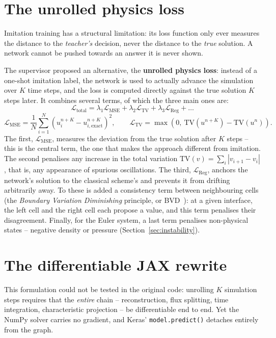 \documentclass[12pt,a4paper,oneside]{report}
\begin{document}
\section{The unrolled physics loss}
\label{sec:loss}

Imitation training has a structural limitation: its loss function only ever
measures the distance to the \emph{teacher's} decision, never the distance to
the \emph{true} solution. A network cannot be pushed towards an answer it is
never shown.

The supervisor proposed an alternative, the \textbf{unrolled physics loss}:
instead of a one-shot imitation label, the network is used to actually advance
the simulation over $K$ time steps, and the loss is computed directly against
the true solution $K$ steps later. It combines several terms, of which the
three main ones are:
\[
\mathcal{L}_{\text{total}} = \lambda_1\mathcal{L}_{\text{MSE}}
+ \lambda_2\mathcal{L}_{\text{TV}}
+ \lambda_3\mathcal{L}_{\text{Reg}} + \dots
\]
\[
\mathcal{L}_{\text{MSE}} = \frac{1}{N}\sum_{i=1}^{N}\left(u_i^{n+K} - u_{i,\text{exact}}^{n+K}\right)^2,
\qquad
\mathcal{L}_{\text{TV}} = \max\left(0,\ \mathrm{TV}(u^{n+K}) - \mathrm{TV}(u^{n})\right).
\]
The first, $\mathcal{L}_{\text{MSE}}$, measures the deviation from the true
solution after $K$ steps -- this is the central term, the one that makes the
approach different from imitation. The second penalises any increase in the
total variation $\mathrm{TV}(v) = \sum_i |v_{i+1}-v_i|$, that is, any
appearance of spurious oscillations. The third, $\mathcal{L}_{\text{Reg}}$,
anchors the network's solution to the classical scheme's and prevents it from
drifting arbitrarily away. To these is added a consistency term between
neighbouring cells (the \emph{Boundary Variation Diminishing} principle, or
BVD~\cite{fu2016}): at a given interface, the left cell and the right cell each
propose a value, and this term penalises their disagreement. Finally, for the
Euler system, a last term penalises non-physical states -- negative density or
pressure (Section~\ref{sec:instability}).

\section{The differentiable JAX rewrite}
\label{sec:jax}

This formulation could not be tested in the original code: unrolling $K$
simulation steps requires that the \emph{entire} chain -- reconstruction, flux
splitting, time integration, characteristic projection -- be differentiable end
to end. Yet the NumPy solver carries no gradient, and Keras'
\texttt{model.predict()} detaches entirely from the graph.
\end{document}
